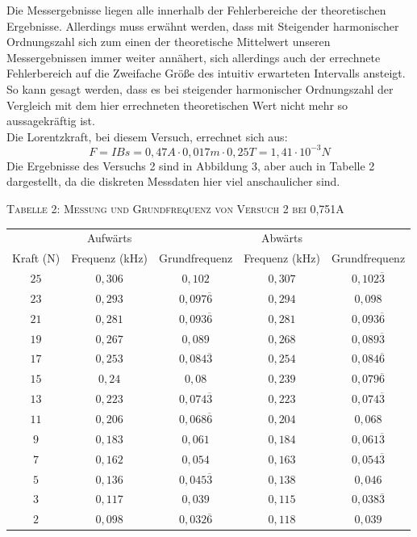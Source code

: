 \documentclass[11pt, a4Paper]{article}
\begin{document}
Die Messergebnisse liegen alle innerhalb der Fehlerbereiche der theoretischen Ergebnisse. Allerdings muss erwähnt werden, dass mit Steigender harmonischer Ordnungszahl sich zum einen der theoretische Mittelwert unseren Messergebnissen immer weiter annähert, sich allerdings auch der errechnete Fehlerbereich auf die Zweifache Größe des intuitiv erwarteten Intervalls ansteigt. So kann gesagt werden, dass es bei steigender harmonischer Ordnungszahl der Vergleich mit dem hier errechneten theoretischen Wert nicht mehr so aussagekräftig ist.\\Die Lorentzkraft, bei diesem Versuch, errechnet sich aus: $$F=IBs=0,47A\cdot 0,017m\cdot 0,25T=1,41\cdot 10^{-3}N$$ Die Ergebnisse des Versuchs 2 sind in Abbildung 3, aber auch in Tabelle 2 dargestellt, da die diskreten Messdaten hier viel anschaulicher sind.\\
\begin{flushleft}
\textsc{Tabelle 2: Messung und Grundfrequenz von Versuch 2 bei 0,751A}
\end{flushleft}
\begin{tabular}{c|cc|cc}
 & Aufwärts & & Abwärts & \\
Kraft (N) & Frequenz (kHz) & Grundfrequenz & Frequenz (kHz) & Grundfrequenz\\
\hline
$25$ & $0,306$ & $0,102$ & $0,307$ & $0,102\overline{3}$\\
$23$ & $0,293$ & $0,097\overline{6}$ & $0,294$ & $0,098$\\
$21$ & $0,281$ & $0,093\overline{6}$ & $0,281$ & $0,093\overline{6}$\\
$19$ & $0,267$ & $0,089$ & $0,268$ & $0,089\overline{3}$\\
$17$ & $0,253$ & $0,084\overline{3}$ & $0,254$ & $0,084\overline{6}$\\
$15$ & $0,24$ & $0,08$ & $0,239$ & $0,079\overline{6}$\\
$13$ & $0,223$ & $0,074\overline{3}$ & $0,223$ & $0,074\overline{3}$\\
$11$ & $0,206$ & $0,068\overline{6}$ & $0,204$ & $0,068$\\
$9$ & $0,183$ & $0,061$ & $0,184$ & $0,061\overline{3}$\\
$7$ & $0,162$ & $0,054$ & $0,163$ & $0,054\overline{3}$\\
$5$ & $0,136$ & $0,045\overline{3}$ & $0,138$ & $0,046$\\
$3$ & $0,117$ & $0,039$ & $0,115$ & $0,038\overline{3}$\\
$2$ & $0,098$ & $0,032\overline{6}$ & $0,118$ & $0,039$\\
\end{tabular}\\
\end{document}
